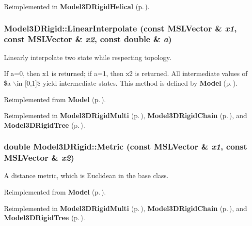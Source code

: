 Reimplemented in {\bf Model3DRigid\-Helical} {\rm (p.\,\pageref{classModel3DRigidHelical_a3})}.
\subsubsection{ Model3DRigid::Linear\-Interpolate (const {\bf MSLVector} \& {\em x1}, const {\bf MSLVector} \& {\em x2}, const double \& {\em a})\hspace{0.3cm}{\tt  [virtual]}}\label{classModel3DRigid_a5}


Linearly interpolate two state while respecting topology.

If a=0, then x1 is returned; if a=1, then x2 is returned. All intermediate values of \$a $\backslash$in [0,1]\$ yield intermediate states. This method is defined by {\bf Model} {\rm (p.\,\pageref{classModel})}. 

Reimplemented from {\bf Model} {\rm (p.\,\pageref{classModel_a6})}.

Reimplemented in {\bf Model3DRigid\-Multi} {\rm (p.\,\pageref{classModel3DRigidMulti_a3})}, {\bf Model3DRigid\-Chain} {\rm (p.\,\pageref{classModel3DRigidChain_a4})}, and {\bf Model3DRigid\-Tree} {\rm (p.\,\pageref{classModel3DRigidTree_a4})}.
\subsubsection{\setlength{\rightskip}{0pt plus 5cm}double Model3DRigid::Metric (const {\bf MSLVector} \& {\em x1}, const {\bf MSLVector} \& {\em x2})\hspace{0.3cm}{\tt  [virtual]}}\label{classModel3DRigid_a4}


A distance metric, which is Euclidean in the base class.



Reimplemented from {\bf Model} {\rm (p.\,\pageref{classModel_a9})}.

Reimplemented in {\bf Model3DRigid\-Multi} {\rm (p.\,\pageref{classModel3DRigidMulti_a2})}, {\bf Model3DRigid\-Chain} {\rm (p.\,\pageref{classModel3DRigidChain_a5})}, and {\bf Model3DRigid\-Tree} {\rm (p.\,\pageref{classModel3DRigidTree_a5})}.
